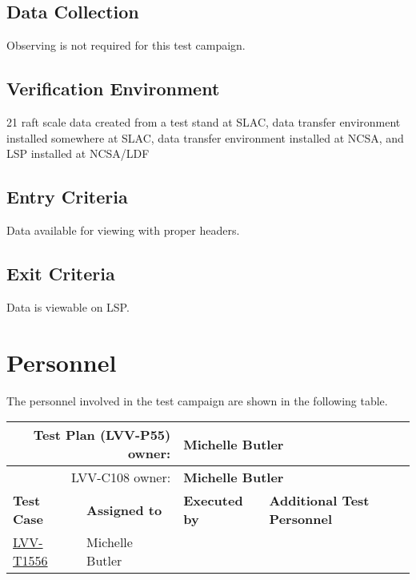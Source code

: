 \documentclass[DM,lsstdraft,STR,toc]{lsstdoc}
\begin{document}
\subsection{Data Collection}

  Observing is not required for this test campaign.

\subsection{Verification Environment}
\label{sect:hwconf}
  21 raft scale data created from a test stand at SLAC, data transfer
environment installed somewhere at SLAC, data transfer environment
installed at NCSA, and LSP installed at NCSA/LDF~

  \subsection{Entry Criteria}
  Data available for viewing with proper headers.~~

  \subsection{Exit Criteria}
  Data is viewable on LSP.~~


\newpage
\section{Personnel}
\label{sect:personnel}

The personnel involved in the test campaign are shown in the following table.

\begin{longtable}{p{3cm}p{3cm}p{3cm}p{6cm}}
\hline
\multicolumn{2}{r}{Test Plan (LVV-P55) owner:} &
\multicolumn{2}{l}{\textbf{ Michelle Butler } }\\\hline
\multicolumn{2}{r}{ LVV-C108 owner:} &
\multicolumn{2}{l}{\textbf{
    Michelle Butler
}
} \\\hline
\textbf{Test Case} & \textbf{Assigned to} & \textbf{Executed by} & \textbf{Additional Test Personnel} \\ \hline
\href{https://jira.lsstcorp.org/secure/Tests.jspa#/testCase/LVV-T1556}{LVV-T1556}
& {\small Michelle Butler } & {\small  } &
\begin{minipage}[]{6cm}
\smallskip
{\small  }
\medskip
\end{minipage}
\\ \hline
\end{longtable}
\end{document}
